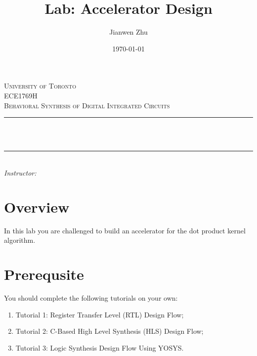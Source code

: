 \documentclass[12pt]{article}
\title{Lab: Accelerator Design}			%
\author{Jianwen Zhu}						%
\date{\today}							%
\makeatletter
\newcommand{\course} {ECE1769H}
\let\thetitle\@title
\let\theauthor\@author
\makeatother
\begin{document}

\begin{titlepage}
	\centering
    \vspace*{0.5 cm}
    \textsc{\LARGE University of Toronto}\\[2.0 cm]	%
	\textsc{\Large \course}\\[0.5 cm]				%
	\textsc{\large Behavioral Synthesis of Digital Integrated Circuits}\\[0.5 cm]				%
	\rule{\linewidth}{0.2 mm} \\[0.4 cm]
	{ \huge \bfseries \thetitle}\\
	\rule{\linewidth}{0.2 mm} \\[1.5 cm]
	
		\large
			\emph{Instructor:}\\
			\theauthor 
			
 
	\vfill
	
\end{titlepage}

\pagebreak


\section{Overview}

In this lab you are challenged to build an accelerator for
the dot product kernel algorithm.

\section{Prerequsite}

You should complete the following tutorials on your own:

\begin{enumerate}
  \item Tutorial 1: Register Transfer Level (RTL) Design Flow;
  \item Tutorial 2: C-Based High Level Synthesis (HLS) Design Flow;
  \item Tutorial 3: Logic Synthesis Design Flow Using YOSYS.
\end{enumerate}
\end{document}
